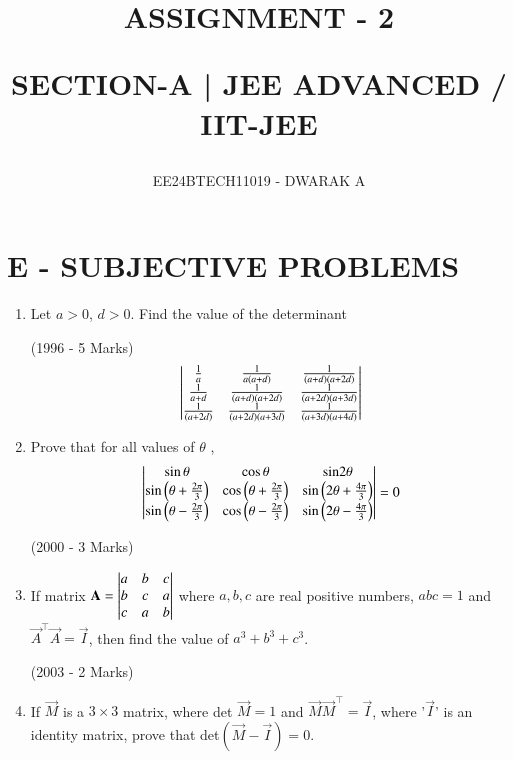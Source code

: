 \documentclass[journal,12pt,onecolumn]{IEEEtran}
\theoremstyle{remark}
\begin{document}

\vspace{3cm}
\title{ASSIGNMENT - 2

SECTION-A | JEE ADVANCED / IIT-JEE}
\author{EE24BTECH11019 - DWARAK A}

\maketitle
\bigskip

\renewcommand{\thefigure}{\theenumi}
\renewcommand{\thetable}{\theenumi}

\section*{E - SUBJECTIVE PROBLEMS}
\bigskip
\begin{multicols}{2}
\begin{enumerate}
	\item Let $a>0$, $d>0$. Find the value of the determinant

		\hfill(1996 - 5 Marks)
		$$\begin{vmatrix}
			\frac{1}{a} & \frac{1}{a(a+d)} & \frac{1}{(a+d)(a+2d)} \\
			\frac{1}{a+d} & \frac{1}{(a+d)(a+2d)} & \frac{1}{(a+2d)(a+3d)} \\
			\frac{1}{(a+2d)} & \frac{1}{(a+2d)(a+3d)} & \frac{1}{(a+3d)(a+4d)}\end{vmatrix}$$

	\item Prove that for all values of $\theta$ ,
		$$\mydet{
			\sin\theta & \cos\theta & \sin$2$\theta \\
			\sin\brak{\theta+\frac{2\pi}{3}} & \cos\brak{\theta+\frac{2\pi}{3}} & \sin\brak{2\theta+\frac{4\pi}{3}} \\
			\sin\brak{\theta-\frac{2\pi}{3}} & \cos\brak{\theta-\frac{2\pi}{3}} & \sin\brak{2\theta-\frac{4\pi}{3}}} = 0$$

		\hfill(2000 - 3 Marks)

	\item If matrix 
		$\mathbf{A} = \begin{vmatrix}
			a & b & c \\
			b & c & a \\
			c & a & b \end{vmatrix} $
		where $a,b,c$ are real positive numbers, $abc=1$ and $\vec{A}^\top\vec{A}=\vec{I}$, then find the value of $a^3+b^3+c^3$.

		\hfill(2003 - 2 Marks)

	\item If $\vec{M}$ is a $3\times3$ matrix, where det $\vec{M}=1$ and $\vec{M}\vec{M}^\top=\vec{I}$, where '$\vec{I}$' is an identity matrix, prove that det$(\vec{M}-\vec{I})=0$.
		

\end{enumerate}
\end{multicols}
\end{document}
